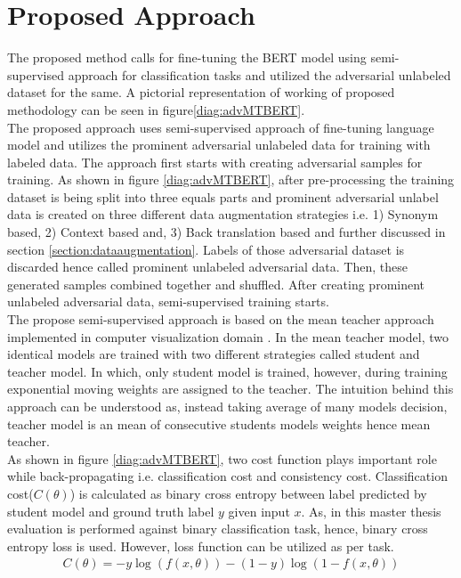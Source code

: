 \documentclass[%
	BCOR=8mm, %
	DIV=12,
	toc=bibliography, %
	toc=listof, %
	oneside, %
	egregdoesnotlikesansseriftitles, %
	]{scrbook}
\begin{document}
\section{Proposed Approach}
The proposed method calls for fine-tuning the BERT model using semi-supervised approach for classification tasks and utilized the adversarial unlabeled dataset for the same. A pictorial representation of working of proposed methodology can be seen in  figure\ref{diag:advMTBERT}.\\
The proposed approach uses semi-supervised approach of fine-tuning language model and utilizes the prominent adversarial unlabeled data for training with labeled data. The approach first starts with creating adversarial samples for training. As shown in figure \ref{diag:advMTBERT}, after pre-processing the training dataset is being split into three equals parts and prominent adversarial unlabel data is created on three different data augmentation strategies i.e. 1) Synonym based, 2) Context based and, 3) Back translation based and further discussed in section \ref{section:dataaugmentation}.  Labels of those adversarial dataset is discarded hence called prominent unlabeled adversarial data. Then, these generated samples combined together and shuffled. After creating prominent unlabeled adversarial data, semi-supervised training starts.\\
The propose semi-supervised approach is based on the mean teacher approach implemented in computer visualization domain \cite{tarvainen_mean_2018}. In the mean teacher model, two identical models are trained with two different strategies called student and teacher model. In which, only student model is trained, however, during training exponential moving weights are assigned to the teacher. The intuition behind this approach can be understood as, instead taking average of many models decision, teacher model is an mean of consecutive students models weights hence mean teacher. \\
As shown in figure \ref{diag:advMTBERT}, two cost function plays important role while back-propagating i.e. classification cost and consistency cost. Classification cost($C(\theta)$) is calculated as binary cross entropy between label predicted by student model and ground truth label $y$ given input $x$.  As, in this master thesis evaluation is performed against binary classification task, hence, binary cross entropy loss is used. However, loss function can be utilized as per task.\\
\begin{equation}
    \begin{aligned}
        C( \theta )=-y \log (f(x,\theta))-(1-y) \log(1-f(x,\theta))
        \label{eq:classification_cost}
    \end{aligned}
\end{equation}
\end{document}
